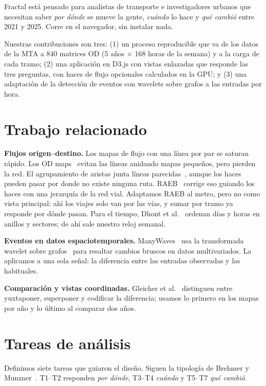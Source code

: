 \documentclass[conference,a4paper]{IEEEtran}
\begin{document}
Fractal está pensado para analistas de transporte e investigadores urbanos que necesitan saber \emph{por dónde} se mueve la gente, \emph{cuándo} lo hace y \emph{qué cambió} entre 2021 y 2025. Corre en el navegador, sin instalar nada.

Nuestras contribuciones son tres: (1) un proceso reproducible que va de los datos de la MTA a 840 matrices OD (5 años $\times$ 168 horas de la semana) y a la carga de cada tramo; (2) una aplicación en D3.js con vistas enlazadas que responde las tres preguntas, con haces de flujo opcionales calculados en la GPU; y (3) una adaptación de la detección de eventos con wavelets sobre grafos a las entradas por hora.

\section{Trabajo relacionado}
\textbf{Flujos origen--destino.} Los mapas de flujo con una línea por par se saturan rápido. Los OD maps~\cite{odmaps} evitan las líneas anidando mapas pequeños, pero pierden la red. El agrupamiento de aristas junta líneas parecidas~\cite{fdeb,kdeeb}, aunque los haces pueden pasar por donde no existe ninguna ruta. RAEB~\cite{raeb} corrige eso guiando los haces con una jerarquía de la red vial. Adaptamos RAEB al metro, pero no como vista principal: ahí los viajes solo van por las vías, y sumar por tramo ya responde por dónde pasan. Para el tiempo, Dhont et al.~\cite{clock} ordenan días y horas en anillos y sectores; de ahí sale nuestro reloj semanal.

\textbf{Eventos en datos espaciotemporales.} ManyWaves~\cite{manywaves} usa la transformada wavelet sobre grafos~\cite{hammond} para resaltar cambios bruscos en datos multivariados. La aplicamos a una sola señal: la diferencia entre las entradas observadas y las habituales.

\textbf{Comparación y vistas coordinadas.} Gleicher et al.~\cite{comparison} distinguen entre yuxtaponer, superponer y codificar la diferencia; usamos lo primero en los mapas por año y lo último al comparar dos años.

\section{Tareas de análisis}
Definimos siete tareas que guiaron el diseño. Siguen la tipología de Brehmer y Munzner~\cite{tasks}. T1--T2 responden \emph{por dónde}, T3--T4 \emph{cuándo} y T5--T7 \emph{qué cambió}.
\end{document}
